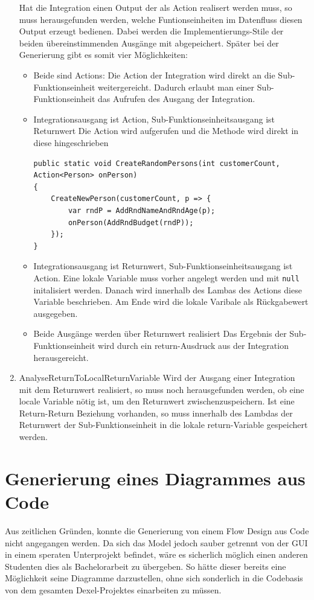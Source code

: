 \begin{enumerate}
		Hat die Integration einen Output der als Action realisert werden muss, so
		muss herausgefunden werden, welche Funtionseinheiten im Datenfluss diesen
		Output erzeugt bedienen. Dabei werden die Implementierungs-Stile der
		beiden übereinstimmenden Ausgänge mit abgepeichert. Später bei der
		Generierung gibt es somit vier Möglichkeiten:
		\begin{itemize}
			\item Beide sind Actions:
			Die Action der Integration wird direkt an die Sub-Funktionseinheit
			weitergereicht. Dadurch erlaubt man einer Sub-Funktionseinheit das
			Aufrufen des Ausgang der Integration.
			\item Integrationsausgang ist Action, Sub-Funktionseinheitsausgang ist
			Returnwert 
			Die Action wird aufgerufen und die Methode wird direkt in diese
			hingeschrieben
			\begin{lstlisting}[caption=Action-Return-Beziehung]
public static void CreateRandomPersons(int customerCount, Action<Person> onPerson)
{
	CreateNewPerson(customerCount, p => {
		var rndP = AddRndNameAndRndAge(p);
		onPerson(AddRndBudget(rndP));
	});
}
			\end{lstlisting}
			\item Integrationsausgang ist Returnwert, Sub-Funktionseinheitsausgang ist
			Action.
			Eine lokale Variable muss vorher angelegt werden und mit \texttt{null}
			initalisiert werden. Danach wird innerhalb des Lambas des Actions diese
			Variable beschrieben. Am Ende wird die lokale Varibale als Rückgabewert
			ausgegeben.
			\item Beide Ausgänge werden über Returnwert realisiert 
		    Das Ergebnis der Sub-Funktionseinheit wird durch ein return-Ausdruck aus der Integration herausgereicht.
		\end{itemize}
			\item AnalyseReturnToLocalReturnVariable
			Wird der Ausgang einer Integration mit dem Returnwert realisiert, so muss noch herausgefunden werden, ob eine locale Variable nötig ist, um den Returnwert zwischenzuspeichern. Ist eine Return-Return Beziehung vorhanden, so muss innerhalb des Lambdas der Returnwert der Sub-Funktionseinheit in die lokale return-Variable gespeichert werden.
	\end{enumerate}
	



\section{Generierung eines Diagrammes aus Code}

Aus zeitlichen Gründen, konnte die Generierung von einem Flow Design aus Code nicht angegangen werden. 
Da sich das Model jedoch sauber getrennt von der GUI in
einem speraten Unterprojekt befindet, wäre es sicherlich möglich einen anderen
Studenten dies als Bachelorarbeit zu übergeben. So hätte dieser bereits eine
Möglichkeit seine Diagramme darzustellen, ohne sich sonderlich in die
Codebasis von dem gesamten Dexel-Projektes einarbeiten zu müssen.
